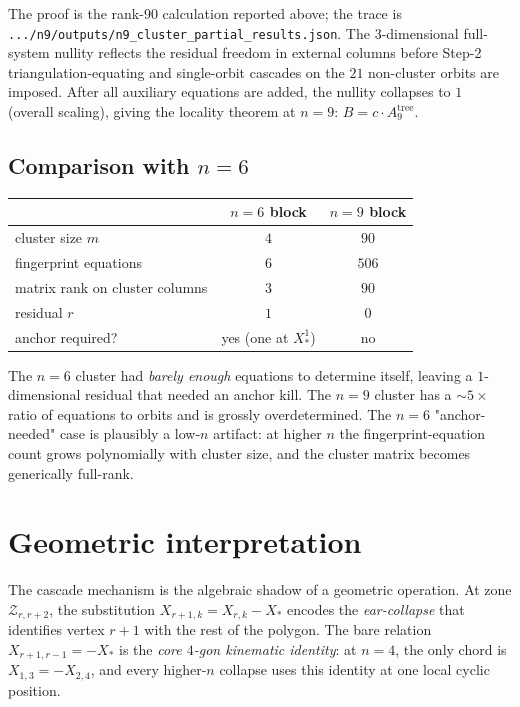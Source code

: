 \documentclass[11pt]{article}
\theoremstyle{definition}
\begin{document}
The proof is the rank-90 calculation reported above; the trace is
\verb|.../n9/outputs/n9_cluster_partial_results.json|. The
$3$-dimensional full-system nullity reflects the residual freedom
in external columns before Step-2 triangulation-equating and
single-orbit cascades on the $21$ non-cluster orbits are imposed.
After all auxiliary equations are added, the nullity collapses to
$1$ (overall scaling), giving the locality theorem at $n=9$:
$B=c\cdot A_9^{\mathrm{tree}}$.

\subsection{Comparison with $n=6$}\label{subsec:compare}

\begin{center}
\begin{tabular}{lcc}
\toprule
& $n=6$ block & $n=9$ block\\
\midrule
cluster size $m$ & $4$ & $90$\\
fingerprint equations & $6$ & $506$\\
matrix rank on cluster columns & $3$ & $90$\\
residual $r$ & $1$ & $0$\\
anchor required? & yes (one at $X_*^{1}$) & no\\
\bottomrule
\end{tabular}
\end{center}

The $n=6$ cluster had \emph{barely enough} equations to determine
itself, leaving a $1$-dimensional residual that needed an anchor
kill. The $n=9$ cluster has a $\sim 5\!\times$ ratio of equations
to orbits and is grossly overdetermined. The $n=6$ "anchor-needed"
case is plausibly a low-$n$ artifact: at higher $n$ the
fingerprint-equation count grows polynomially with cluster size,
and the cluster matrix becomes generically full-rank.

\section{Geometric interpretation}\label{sec:geom}

The cascade mechanism is the algebraic shadow of a geometric
operation. At zone $\mathcal Z_{r,r+2}$, the substitution
$X_{r+1,k}=X_{r,k}-X_*$ encodes the \emph{ear-collapse} that
identifies vertex $r{+}1$ with the rest of the polygon. The bare
relation $X_{r+1,r-1}=-X_*$ is the \emph{core $4$-gon kinematic
identity}: at $n=4$, the only chord is $X_{1,3}=-X_{2,4}$, and every
higher-$n$ collapse uses this identity at one local cyclic position.
\end{document}
